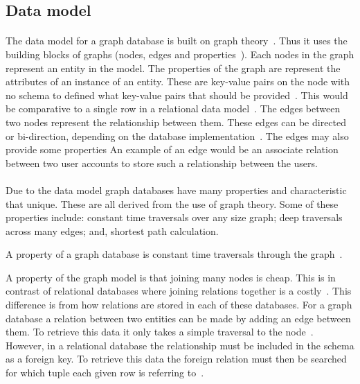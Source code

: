 \documentclass{CRPITStyle}
\renewcommand{\cite}{\citep}
\begin{document}
\subsection{Data model}

\paragraph{}
The data model for a graph database is built on graph
theory~\cite{nosql_survey,sql_nosql,graphdb}.
Thus it uses the building blocks of graphs (nodes, edges and
properties~\cite{graphdb}).
Each nodes in the graph represent an entity in the model.
The properties of the graph are represent the attributes of 
an instance of an entity.
These are key-value pairs on the node with no schema to defined what
key-value pairs that should be provided~\cite{neo4j}.
This would be comparative to a single row in a relational data
model~\cite{relational_db}.
The edges between two nodes represent the relationship between
them.
These edges can be directed or bi-direction, depending on the database
implementation~\cite{graphdb,neo4j}.
The edges may also provide some properties
An example of an edge would be an associate relation between two user accounts
to store such a relationship between the users.

\paragraph{}
Due to the data model graph databases have many properties and
characteristic that unique.
These are all derived from the use of graph theory.
Some of these properties include:
constant time traversals over any size graph;
deep traversals across many edges;
and, shortest path calculation.

A property of a graph database is constant time traversals through the
graph~\cite{sql_nosql}.

A property of the graph model is that joining many nodes is cheap.
This is in contrast of relational databases where joining relations
together is a costly~\cite{relational_db}.
This difference is from how relations are stored in each of these
databases.
For a graph database a relation between two entities can be made
by adding an edge between them.
To retrieve this data it only takes a simple traversal to the
node~\cite{neo4j}.
However, in a relational database the relationship must be included
in the schema as a foreign key.
To retrieve this data the foreign relation must then be searched for
which tuple each given row is referring to~\cite{relational_db}.
\end{document}
